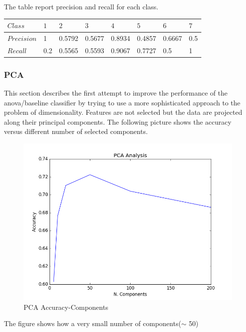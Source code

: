 \documentclass[a4paper,10pt]{article}
\begin{document}
      The table report precision and recall for each class.
      \begin{table}[H]
      	\centering
	\begin{tabular}{l|P{1cm}P{1cm}P{1cm}P{1cm}P{1cm}P{1cm}P{1cm}} \toprule
	  {$Class$} & {$1$} & {$2$} & {$3$} & {$4$} & {$5$} & {$6$} & {$7$} \\ \midrule
	  $Precision$  & 1 & 0.5792 & 0.5677 & 0.8934  & 0.4857 &  0.6667  & 0.5 \\ \midrule
	  $Recall$  & 0.2 &  0.5565 &  0.5593 & 0.9067 & 0.7727  & 0.5 & 1  \\ \bottomrule
	\end{tabular}
      \end{table}
      
     \subsubsection{PCA}
      This section describes the first attempt to improve the performance of the anova/baseline classifier by trying to use a more 
      sophisticated approach to the problem of dimensionality. 
      Features are not selected but the data are projected along their principal components.\newline
      The following picture shows the accuracy versus different number of selected components.
      \begin{figure}[H]
	\centering
	\includegraphics[scale=0.5]{pca-acc.png}
	\caption{PCA Accuracy-Components}
      \end{figure}
      \noindent The figure shows how a very small number of components($\sim$ 50) 
\end{document}
